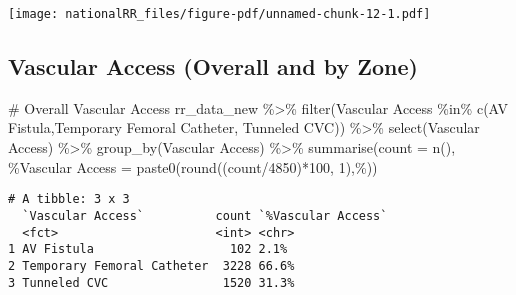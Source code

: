 \documentclass[
  letterpaper,
  DIV=11,
  numbers=noendperiod]{scrartcl}
\newenvironment{Shaded}{\begin{snugshade}}{\end{snugshade}}
\newcommand{\AttributeTok}[1]{\textcolor[rgb]{0.40,0.45,0.13}{#1}}
\newcommand{\CommentTok}[1]{\textcolor[rgb]{0.37,0.37,0.37}{#1}}
\newcommand{\DecValTok}[1]{\textcolor[rgb]{0.68,0.00,0.00}{#1}}
\newcommand{\FunctionTok}[1]{\textcolor[rgb]{0.28,0.35,0.67}{#1}}
\newcommand{\NormalTok}[1]{\textcolor[rgb]{0.00,0.23,0.31}{#1}}
\newcommand{\OtherTok}[1]{\textcolor[rgb]{0.00,0.23,0.31}{#1}}
\newcommand{\SpecialCharTok}[1]{\textcolor[rgb]{0.37,0.37,0.37}{#1}}
\newcommand{\StringTok}[1]{\textcolor[rgb]{0.13,0.47,0.30}{#1}}
\begin{document}
\texttt{[image: nationalRR\_files/figure-pdf/unnamed-chunk-12-1.pdf]}

\subsection{Vascular Access (Overall and by
Zone)}\label{vascular-access-overall-and-by-zone}

\begin{Shaded}
\begin{Highlighting}[]
\CommentTok{\# Overall Vascular Access}
\NormalTok{rr\_data\_new }\SpecialCharTok{\%\textgreater{}\%}
  \FunctionTok{filter}\NormalTok{(}\StringTok{\textasciigrave{}}\AttributeTok{Vascular Access}\StringTok{\textasciigrave{}} \SpecialCharTok{\%in\%} \FunctionTok{c}\NormalTok{(}\StringTok{\textquotesingle{}AV Fistula\textquotesingle{}}\NormalTok{,}\StringTok{\textquotesingle{}Temporary Femoral Catheter\textquotesingle{}}\NormalTok{,}
                                  \StringTok{\textquotesingle{}Tunneled CVC\textquotesingle{}}\NormalTok{)) }\SpecialCharTok{\%\textgreater{}\%} 
  \FunctionTok{select}\NormalTok{(}\StringTok{\textasciigrave{}}\AttributeTok{Vascular Access}\StringTok{\textasciigrave{}}\NormalTok{) }\SpecialCharTok{\%\textgreater{}\%} 
  \FunctionTok{group\_by}\NormalTok{(}\StringTok{\textasciigrave{}}\AttributeTok{Vascular Access}\StringTok{\textasciigrave{}}\NormalTok{) }\SpecialCharTok{\%\textgreater{}\%} 
  \FunctionTok{summarise}\NormalTok{(}\AttributeTok{count =} \FunctionTok{n}\NormalTok{(),}
         \StringTok{\textasciigrave{}}\AttributeTok{\%Vascular Access}\StringTok{\textasciigrave{}} \OtherTok{=} \FunctionTok{paste0}\NormalTok{(}\FunctionTok{round}\NormalTok{((count}\SpecialCharTok{/}\DecValTok{4850}\NormalTok{)}\SpecialCharTok{*}\DecValTok{100}\NormalTok{, }\DecValTok{1}\NormalTok{),}\StringTok{\textquotesingle{}\%\textquotesingle{}}\NormalTok{))}
\end{Highlighting}
\end{Shaded}

\begin{verbatim}
# A tibble: 3 x 3
  `Vascular Access`          count `%Vascular Access`
  <fct>                      <int> <chr>             
1 AV Fistula                   102 2.1%              
2 Temporary Femoral Catheter  3228 66.6%             
3 Tunneled CVC                1520 31.3%             
\end{verbatim}
\end{document}
